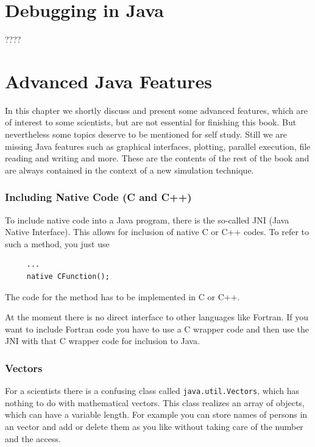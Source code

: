 \section{Debugging in Java}
????

\section{Advanced Java Features}
In this chapter we shortly discuss and present some advanced
features, which are of interest to some scientists, but are not
essential for finishing this book. But nevertheless some
topics deserve to be mentioned for self study.
Still we are missing Java features such as graphical interfaces,
plotting, parallel execution, file reading and writing and more. 
These are the contents of the rest of the book and are always
contained in the context of a new simulation technique. 

\subsubsection{Including Native Code (C and C++)}
To include native code into a Java program, there is the so-called
JNI (Java Native Interface). This allows for inclusion of native
C or C++ codes. To refer to such a method, you just use
\begin{verbatim}
     ...
     native CFunction();
\end{verbatim}
The code for the method has to be implemented in C or C++.

At the moment there is no direct interface to other languages like
Fortran. If you want to include Fortran code you have to use
a C wrapper code and then use the JNI with that C wrapper code
for inclusion to Java.

\subsubsection{Vectors}
For a scientists there is a confusing class called \verb|java.util.Vectors|, 
which has nothing to do with mathematical vectors. This class realizes
an array of objects, which can have a variable length. For example
you can store names of persons in an vector and add or delete them as
you like without taking care of the number and the access. 

